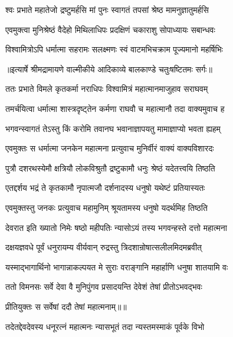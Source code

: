 \twolineshloka
{श्वः प्रभाते महातेजो द्रष्टुमर्हसि मां पुनः}
{स्वागतं तपसां श्रेष्ठ मामनुज्ञातुमर्हसि} %

\twolineshloka
{एवमुक्त्वा मुनिश्रेष्ठं वैदेहो मिथिलाधिपः}
{प्रदक्षिणं चकाराशु सोपाध्यायः सबान्धवः} %

\twolineshloka
{विश्वामित्रोऽपि धर्मात्मा सहरामः सलक्ष्मणः}
{स्वं वाटमभिचक्राम पूज्यमानो महर्षिभिः} %


{॥इत्यार्षे श्रीमद्रामायणे वाल्मीकीये आदिकाव्ये बालकाण्डे चतुःषष्टितमः सर्गः॥}


\twolineshloka
{ततः प्रभाते विमले कृतकर्मा नराधिपः}
{विश्वामित्रं महात्मानमाजुहाव सराघवम्} %

\twolineshloka
{तमर्चयित्वा धर्मात्मा शास्त्रदृष्ट्तेन कर्मणा}
{राघवौ च महात्मानौ तदा वाक्यमुवाच ह} %

\twolineshloka
{भगवन्स्वागतं तेऽस्तु किं करोमि तवानघ}
{भवानाज्ञापयतु मामाज्ञाप्यो भवता ह्यहम्} %

\twolineshloka
{एवमुक्तः स धर्मात्मा जनकेन महात्मना}
{प्रत्युवाच मुनिर्वीरं वाक्यं वाक्यविशारदः} %

\twolineshloka
{पुत्रौ दशरथस्येमौ क्षत्रियौ लोकविश्रुतौ}
{द्रष्टुकामौ धनुः श्रेष्ठं यदेतत्त्वयि तिष्ठति} %

\twolineshloka
{एतद्दर्शय भद्रं ते कृतकामौ नृपात्मजौ}
{दर्शनादस्य धनुषो यथेष्टं प्रतियास्यतः} %

\twolineshloka
{एवमुक्तस्तु जनकः प्रत्युवाच महामुनिम्}
{श्रूयतामस्य धनुषो यदर्थमिह तिष्ठति} %

\twolineshloka
{देवरात इति ख्यातो निमेः षष्ठो महीपतिः}
{न्यासोऽयं तस्य भगवन्हस्ते दत्तो महात्मना} %

\twolineshloka
{दक्षयज्ञवधे पूर्वं धनुरायम्य वीर्यवान्}
{रुद्रस्तु त्रिदशान्रोषात्सलीलमिदमब्रवीत्} %

\twolineshloka
{यस्माद्भागार्थिनो भागान्नाकल्पयत मे सुराः}
{वराङ्गानि महार्हाणि धनुषा शातयामि वः} %

\twolineshloka
{ततो विमनसः सर्वे देवा वै मुनिपुंगव}
{प्रसादयन्ति देवेशं तेषां प्रीतोऽभवद्भवः} %

{प्रीतियुक्तः स सर्वेषां ददौ तेषां महात्मनाम्॥॥} %

\addtocounter{shlokacount}{1}

\twolineshloka
{तदेतद्देवदेवस्य धनूरत्नं महात्मनः}
{न्यासभूतं तदा न्यस्तमस्माकं पूर्वके विभो} %

